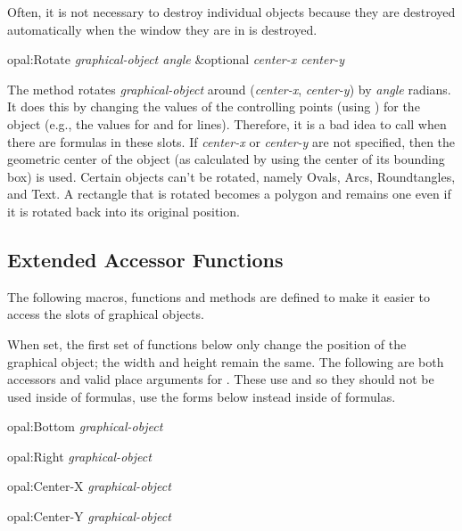 Often, it is not necessary to destroy individual objects because they
are destroyed automatically when the window they are in is destroyed.

\vspace{1 line}
\begin{programexample}
opal:Rotate {\it graphical-object angle} \&optional {\it center-x center-y}\value{method}
\end{programexample}

The  method rotates {\it graphical-object} around
{\obeyspaces ({\it center-x}, {\it center-y})} by {\it angle} radians.  It does this by
changing the values of the controlling points (using ) for the
object (e.g., the
values for  and  for lines).  Therefore, it is a
bad idea to call  when there are formulas in these slots.
If {\it center-x} or
{\it center-y} are not specified, then the geometric center of the object (as
calculated by using the center of its bounding box) is used.  Certain
objects can't be rotated, namely Ovals, Arcs, Roundtangles, and Text.  A
rectangle that is rotated becomes a polygon and remains one even if it is
rotated back into its original position.


\begin{group}
\section{Extended Accessor Functions}
\label{Extended-accessors}

The following macros, functions and  methods are defined to make it
easier to access the slots of graphical objects.

When set, the first set of functions below only change the position of
the graphical object; the width
and height remain the same.  The following are both accessors and valid
place arguments for .  These use  and  so
they should not be used inside of formulas, use the  forms below
instead inside of formulas.

   
\begin{programexample}
opal:Bottom {\it graphical-object}\value{function}

opal:Right {\it graphical-object}\value{function}

opal:Center-X {\it graphical-object}\value{function}

opal:Center-Y {\it graphical-object}\value{function}
\end{programexample}
\end{group}

